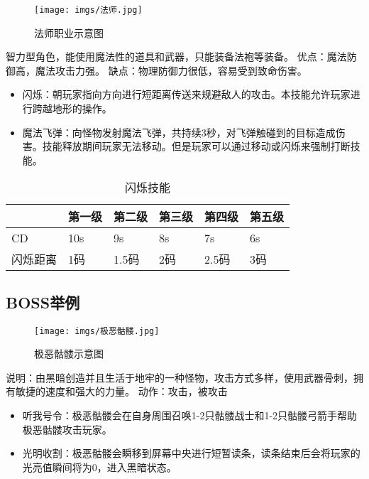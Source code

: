 \begin{figure}[ht]
    \centering
    \texttt{[image: imgs/法师.jpg]}
    \caption{法师职业示意图}
\end{figure}

智力型角色，能使用魔法性的道具和武器，只能装备法袍等装备。
优点：魔法防御高，魔法攻击力强。 缺点：物理防御力很低，容易受到致命伤害。

\begin{itemize}
    \item 闪烁：朝玩家指向方向进行短距离传送来规避敌人的攻击。本技能允许玩家进行跨越地形的操作。
    \item 魔法飞弹：向怪物发射魔法飞弹，共持续3秒，对飞弹触碰到的目标造成伤害。技能释放期间玩家无法移动。但是玩家可以通过移动或闪烁来强制打断技能。
\end{itemize}

\begin{table}[h]
    \centering
    \caption{闪烁技能}
    \begin{tabular}{@{}llllll@{}}
    \toprule
         & 第一级 & 第二级  & 第三级 & 第四级  & 第五级 \\ \midrule
    CD   & 10s & 9s   & 8s  & 7s   & 6s  \\
    闪烁距离 & 1码  & 1.5码 & 2码  & 2.5码 & 3码  \\ \bottomrule
    \end{tabular}
\end{table}

\subsection{BOSS举例}
\begin{figure}[ht]
    \centering
    \texttt{[image: imgs/极恶骷髅.jpg]}
    \caption{极恶骷髅示意图}
\end{figure}

说明：由黑暗创造并且生活于地牢的一种怪物，攻击方式多样，使用武器骨刺，拥有敏捷的速度和强大的力量。
动作：攻击，被攻击

\begin{itemize}
    \item 听我号令：极恶骷髅会在自身周围召唤1-2只骷髅战士和1-2只骷髅弓箭手帮助极恶骷髅攻击玩家。
    \item 光明收割：极恶骷髅会瞬移到屏幕中央进行短暂读条，读条结束后会将玩家的光亮值瞬间将为0，进入黑暗状态。
\end{itemize}